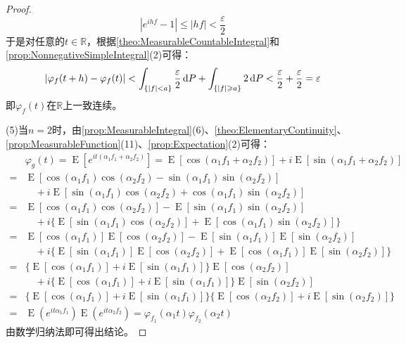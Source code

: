 \begin{proof}
\begin{equation*}
		|e^{ihf}-1|\leqslant |hf|<\frac{\varepsilon}{2}
	\end{equation*}
	于是对任意的$t\in\mathbb{R}$，根据\cref{theo:MeasurableCountableIntegral}和\cref{prop:NonnegativeSimpleIntegral}(2)可得：
	\begin{equation*}
		|\varphi_f(t+h)-\varphi_f(t)|<\int_{\{|f|<a\}}\frac{\varepsilon}{2}\mathop{}\!\mathrm{d} P+\int_{\{|f|\geqslant a\}}2\mathop{}\!\mathrm{d} P<\frac{\varepsilon}{2}+\frac{\varepsilon}{2}=\varepsilon
	\end{equation*}
	即$\varphi_f(t)$在$\mathbb{R}$上一致连续。\par
	(5)当$n=2$时，由\cref{prop:MeasurableIntegral}(6)、\cref{theo:ElementaryContinuity}、\cref{prop:MeasurableFunction}(11)、\cref{prop:Expectation}(2)可得：
	\begin{align*}
		&\varphi_{g}(t)=\operatorname{E}[e^{it(\alpha_1f_1+\alpha_2f_2)}]=\operatorname{E}[\cos(\alpha_1f_1+\alpha_2f_2)]+i\operatorname{E}[\sin(\alpha_1f_1+\alpha_2f_2)] \\
		=&\operatorname{E}[\cos(\alpha_1f_1)\cos(\alpha_2f_2)-\sin(\alpha_1f_1)\sin(\alpha_2f_2)] \\
		&\quad+i\operatorname{E}[\sin(\alpha_1f_1)\cos(\alpha_2f_2)+\cos(\alpha_1f_1)\sin(\alpha_2f_2)] \\
		=&\operatorname{E}[\cos(\alpha_1f_1)\cos(\alpha_2f_2)]-\operatorname{E}[\sin(\alpha_1f_1)\sin(\alpha_2f_2)] \\
		&\quad+i\{\operatorname{E}[\sin(\alpha_1f_1)\cos(\alpha_2f_2)]+\operatorname{E}[\cos(\alpha_1f_1)\sin(\alpha_2f_2)]\}  \\
		=&\operatorname{E}[\cos(\alpha_1f_1)]\operatorname{E}[\cos(\alpha_2f_2)]-\operatorname{E}[\sin(\alpha_1f_1)]\operatorname{E}[\sin(\alpha_2f_2)] \\
		&\quad+i\{\operatorname{E}[\sin(\alpha_1f_1)]\operatorname{E}[\cos(\alpha_2f_2)]+\operatorname{E}[\cos(\alpha_1f_1)]\operatorname{E}[\sin(\alpha_2f_2)]\} \\
		=&\{\operatorname{E}[\cos(\alpha_1f_1)]+i\operatorname{E}[\sin(\alpha_1f_1)]\}\operatorname{E}[\cos(\alpha_2f_2)] \\
		&\quad+i\{\operatorname{E}[\cos(\alpha_1f_1)]+i\operatorname{E}[\sin(\alpha_1f_1)]\}\operatorname{E}[\sin(\alpha_2f_2)] \\
		=&\{\operatorname{E}[\cos(\alpha_1f_1)]+i\operatorname{E}[\sin(\alpha_1f_1)]\}\{\operatorname{E}[\cos(\alpha_2f_2)]+i\operatorname{E}[\sin(\alpha_2f_2)]\} \\
		=&\operatorname{E}(e^{it\alpha_1f_1})\operatorname{E}(e^{it\alpha_2f_2})=\varphi_{f_1}(\alpha_1t)\varphi_{f_2}(\alpha_2t)
	\end{align*}
	由数学归纳法即可得出结论。
\end{proof}

